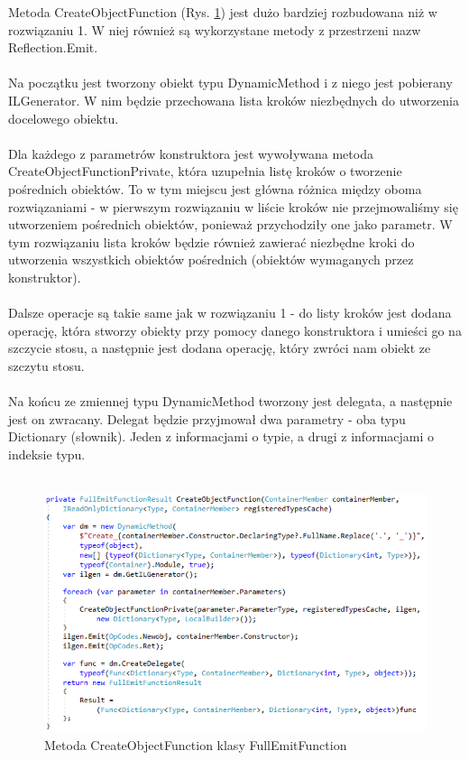 \documentclass[12pt]{article}
\begin{document}
Metoda CreateObjectFunction (Rys. \ref{fig:FullEmitFunction_CreateObjectFunction}) jest dużo bardziej rozbudowana niż w rozwiązaniu 1. W niej również są wykorzystane metody z przestrzeni nazw Reflection.Emit.\\
\\
Na początku jest tworzony obiekt typu DynamicMethod i z niego jest pobierany ILGenerator. W nim będzie przechowana lista kroków niezbędnych do utworzenia docelowego obiektu.\\
\\
Dla każdego z parametrów konstruktora jest wywoływana metoda CreateObjectFunctionPrivate, która uzupełnia listę kroków o tworzenie pośrednich obiektów. To w tym miejscu jest główna różnica między oboma rozwiązaniami - w pierwszym rozwiązaniu w liście kroków nie przejmowaliśmy się utworzeniem pośrednich obiektów, ponieważ przychodziły one jako parametr. W tym rozwiązaniu lista kroków będzie również zawierać niezbędne kroki do utworzenia wszystkich obiektów pośrednich (obiektów wymaganych przez konstruktor).\\
\\
Dalsze operacje są takie same jak w rozwiązaniu 1 - do listy kroków jest dodana operację, która stworzy obiekty przy pomocy danego konstruktora i umieści go na szczycie stosu, a następnie jest dodana operację, który zwróci nam obiekt ze szczytu stosu.\\
\\
Na końcu ze zmiennej typu DynamicMethod tworzony jest delegata, a następnie jest on zwracany. Delegat będzie przyjmował dwa parametry - oba typu Dictionary (słownik). Jeden z informacjami o typie, a drugi z informacjami o indeksie typu.\\ \\
\begin{figure}[H]
	\begin{center}
  		\includegraphics{FullEmitFunction_CreateObjectFunction.png}
  		\caption{Metoda CreateObjectFunction klasy FullEmitFunction}
  		\label{fig:FullEmitFunction_CreateObjectFunction}
	\end{center}
\end{figure}
\end{document}
